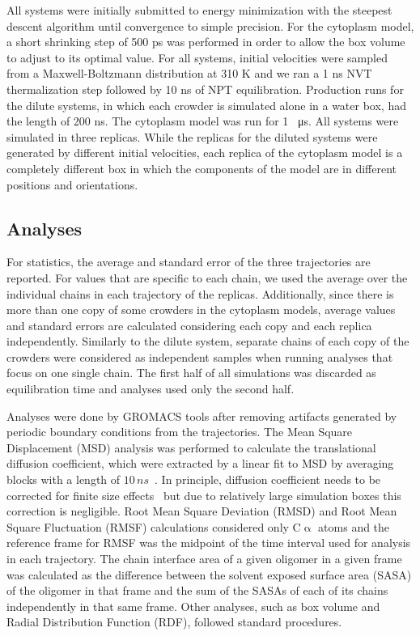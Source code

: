 \documentclass[journal=jacsat,manuscript=article]{achemso}
\begin{document}
All systems were initially submitted to energy minimization with the steepest descent algorithm until convergence to simple precision. For the cytoplasm model, a short shrinking step of 500 ps was performed in order to allow the box volume to adjust to its optimal value. For all systems, initial velocities were sampled from a Maxwell-Boltzmann distribution at 310 K and we ran a 1 ns NVT thermalization step followed by 10 ns of NPT equilibration. Production runs for the dilute systems, in which each crowder is simulated alone in a water box, had the length of 200 ns. The cytoplasm model was run for 1 \SI{}{\micro\second}. All systems were simulated in three replicas. While the replicas for the diluted systems were generated by different initial velocities, each replica of the cytoplasm model is a completely different box in which the components of the model are in different positions and orientations.

\subsection{Analyses}
For statistics, the average and standard error of the three trajectories are reported. For values that are specific to each chain, we used the average over the individual chains in each trajectory of the replicas. Additionally, since there is more than one copy of some crowders in the cytoplasm models, average values and standard errors are calculated considering each copy and each replica independently. Similarly to the dilute system, separate chains of each copy of the crowders were considered as independent samples when running analyses that focus on one single chain. The first half of all simulations was discarded as equilibration time and analyses used only the second half.

Analyses were done by GROMACS tools after removing artifacts generated by periodic boundary conditions from the trajectories. The Mean Square Displacement (MSD) analysis was performed to calculate the translational diffusion coefficient, which were extracted by a linear fit to MSD by averaging blocks with a length of $10 \,ns$~\cite{Allen1987a}. In principle, diffusion coefficient needs to be corrected for finite size effects~\cite{Yeh2004} but due to relatively large simulation boxes this correction is negligible. Root Mean Square Deviation (RMSD) and Root Mean Square Fluctuation (RMSF) calculations considered only C$\upalpha$ atoms and the reference frame for RMSF was the midpoint of the time interval used for analysis in each trajectory. The chain interface area of a given oligomer in a given frame was calculated as the difference between the solvent exposed surface area (SASA) of the oligomer in that frame and the sum of the SASAs of each of its chains independently in that same frame. Other analyses, such as box volume and Radial Distribution Function (RDF), followed standard procedures.
\end{document}
